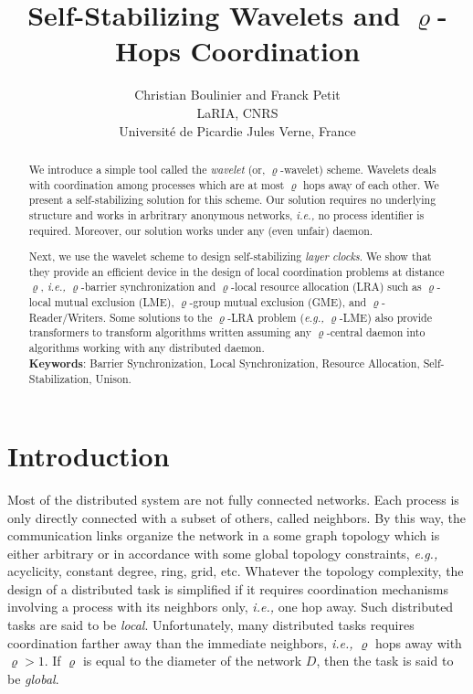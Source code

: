 \documentclass[11pt]{article}
\newcommand{\eg}{\emph{e.g., }}
\newcommand{\ie}{\emph{i.e., }}
\begin{document}
\title{ Self-Stabilizing Wavelets and $\varrho$-Hops Coordination}



\author{
Christian Boulinier and Franck Petit\\
LaRIA, CNRS \\
Universit\'{e} de Picardie Jules Verne, France\\
}

\date{}
\maketitle

\footnotesize
\begin{abstract}
We introduce a simple tool called the \emph{wavelet} (or, $\varrho$-wavelet) scheme.  
Wavelets deals with coordination among processes which are at most
$\varrho$ hops away of each other.  
We present a self-stabilizing solution for this scheme.  Our solution requires no underlying 
structure and works in arbritrary anonymous networks, \ie no process identifier is required.  
Moreover, our solution works under any (even unfair) daemon. 

Next, we use the wavelet scheme to design self-stabilizing \emph{layer clocks}.  
We show that they provide an efficient device in the design of local coordination 
problems at distance $\varrho$, \ie $\varrho$-barrier synchronization and
$\varrho$-local resource allocation (LRA) such as $\varrho$-local mutual exclusion (LME), 
$\varrho$-group mutual exclusion (GME), and $\varrho$-Reader/Writers.  Some solutions to 
the $\varrho$-LRA problem (\eg $\varrho$-LME) also provide transformers 
to transform algorithms written assuming any $\varrho$-central daemon into algorithms working 
with any distributed daemon.  
\\

\textbf{Keywords}: Barrier Synchronization,  Local Synchronization, Resource Allocation, Self-Stabili\-zation, Unison. \end{abstract}
\normalsize





\section{Introduction}

Most of the distributed system are not fully connected networks.  
Each process is only directly connected with a subset of others, called neighbors.  By this way, 
the communication links organize the network in a some graph topology which is either arbitrary or 
in accordance with some global topology constraints, \eg acyclicity, constant degree, ring, grid, etc.  
Whatever the topology complexity, the design 
of a distributed task is simplified if it requires coordination mechanisms involving a process with
its neighbors only, \ie  one hop away.  Such distributed tasks are said to be \emph{local}.  
Unfortunately, many distributed tasks requires coordination farther away than the immediate neighbors, 
\ie $\varrho$ hops away with $\varrho > 1$.  If $\varrho$ is equal to the diameter of the network $D$, then
the task is said to be \emph{global}. 
\end{document}

